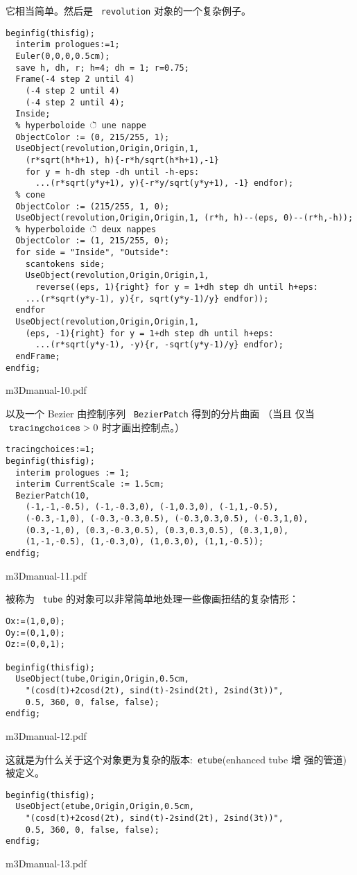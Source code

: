 \documentclass[a4paper,12pt]{article}
\begin{document}
它相当简单。然后是 ~{\tt revolution} 对象的一个复杂例子。
\begin{verbatim}
beginfig(thisfig);
  interim prologues:=1;
  Euler(0,0,0,0.5cm);
  save h, dh, r; h=4; dh = 1; r=0.75;
  Frame(-4 step 2 until 4)
    (-4 step 2 until 4)
    (-4 step 2 until 4);
  Inside;
  % hyperboloide ॆ une nappe
  ObjectColor := (0, 215/255, 1);
  UseObject(revolution,Origin,Origin,1,
    (r*sqrt(h*h+1), h){-r*h/sqrt(h*h+1),-1}
    for y = h-dh step -dh until -h-eps:
      ...(r*sqrt(y*y+1), y){-r*y/sqrt(y*y+1), -1} endfor);
  % cone
  ObjectColor := (215/255, 1, 0);
  UseObject(revolution,Origin,Origin,1, (r*h, h)--(eps, 0)--(r*h,-h));
  % hyperboloide ॆ deux nappes
  ObjectColor := (1, 215/255, 0);
  for side = "Inside", "Outside":
    scantokens side;
    UseObject(revolution,Origin,Origin,1,
      reverse((eps, 1){right} for y = 1+dh step dh until h+eps:
    ...(r*sqrt(y*y-1), y){r, sqrt(y*y-1)/y} endfor));
  endfor
  UseObject(revolution,Origin,Origin,1,
    (eps, -1){right} for y = 1+dh step dh until h+eps:
      ...(r*sqrt(y*y-1), -y){r, -sqrt(y*y-1)/y} endfor);
  endFrame;
endfig;
\end{verbatim}
\centerline{\XeTeXpdffile m3Dmanual-10.pdf}

以及一个 Bezier 由控制序列 ~{\tt BezierPatch} 得到的分片曲面 （当且
仅当 
 $ ~{\tt tracingchoices} >0$  时才画出控制点。）
  \begin{verbatim}
tracingchoices:=1;
beginfig(thisfig);
  interim prologues := 1;
  interim CurrentScale := 1.5cm;
  BezierPatch(10,
    (-1,-1,-0.5), (-1,-0.3,0), (-1,0.3,0), (-1,1,-0.5),
    (-0.3,-1,0), (-0.3,-0.3,0.5), (-0.3,0.3,0.5), (-0.3,1,0),
    (0.3,-1,0), (0.3,-0.3,0.5), (0.3,0.3,0.5), (0.3,1,0),
    (1,-1,-0.5), (1,-0.3,0), (1,0.3,0), (1,1,-0.5));
endfig;
\end{verbatim}
\centerline{\XeTeXpdffile m3Dmanual-11.pdf}
 
 
 被称为 ~{\tt tube} 的对象可以非常简单地处理一些像画扭结的复杂情形： 
\begin{verbatim}
Ox:=(1,0,0);
Oy:=(0,1,0);
Oz:=(0,0,1);

beginfig(thisfig);
  UseObject(tube,Origin,Origin,0.5cm,
    "(cosd(t)+2cosd(2t), sind(t)-2sind(2t), 2sind(3t))",
    0.5, 360, 0, false, false);
endfig;
\end{verbatim}
\centerline{\XeTeXpdffile m3Dmanual-12.pdf}

 这就是为什么关于这个对象更为复杂的版本:~{\tt etube}(enhanced tube 增
 强的管道)被定义。
\begin{verbatim}
beginfig(thisfig);
  UseObject(etube,Origin,Origin,0.5cm,
    "(cosd(t)+2cosd(2t), sind(t)-2sind(2t), 2sind(3t))",
    0.5, 360, 0, false, false);
endfig;
\end{verbatim}
\centerline{\XeTeXpdffile m3Dmanual-13.pdf}
\end{document}
